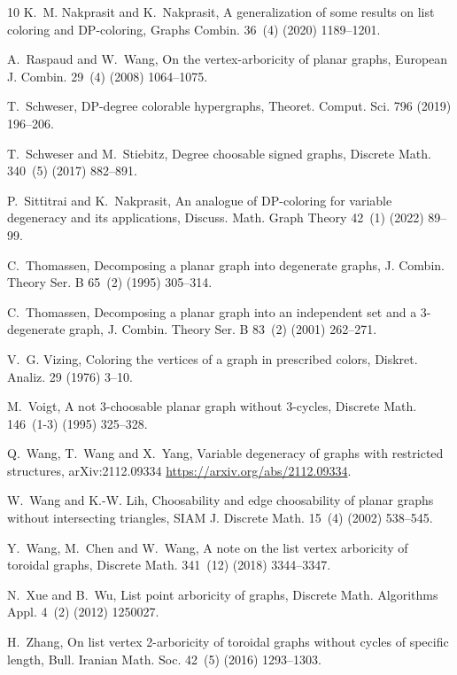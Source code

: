 \documentclass{article}
\theoremstyle{definition}
\begin{document}
\begin{thebibliography}{10}
K.~M. Nakprasit and K.~Nakprasit, A generalization of some results on list
  coloring and {DP}-coloring, Graphs Combin. 36~(4) (2020) 1189--1201.

A.~Raspaud and W.~Wang, On the vertex-arboricity of planar graphs, European J.
  Combin. 29~(4) (2008) 1064--1075.

T.~Schweser, D{P}-degree colorable hypergraphs, Theoret. Comput. Sci. 796
  (2019) 196--206.

T.~Schweser and M.~Stiebitz, Degree choosable signed graphs, Discrete Math.
  340~(5) (2017) 882--891.

P.~Sittitrai and K.~Nakprasit, An analogue of {DP}-coloring for variable
  degeneracy and its applications, Discuss. Math. Graph Theory 42~(1) (2022)
  89--99.

C.~Thomassen, Decomposing a planar graph into degenerate graphs, J. Combin.
  Theory Ser. B 65~(2) (1995) 305--314.

C.~Thomassen, Decomposing a planar graph into an independent set and a
  3-degenerate graph, J. Combin. Theory Ser. B 83~(2) (2001) 262--271.

V.~G. Vizing, Coloring the vertices of a graph in prescribed colors, Diskret.
  Analiz. 29 (1976) 3--10.

M.~Voigt, A not {$3$}-choosable planar graph without {$3$}-cycles, Discrete
  Math. 146~(1-3) (1995) 325--328.

Q.~Wang, T.~Wang and X.~Yang, Variable degeneracy of graphs with restricted
  structures, arXiv:2112.09334   \url{https://arxiv.org/abs/2112.09334}.

W.~Wang and K.-W. Lih, Choosability and edge choosability of planar graphs
  without intersecting triangles, SIAM J. Discrete Math. 15~(4) (2002)
  538--545.

Y.~Wang, M.~Chen and W.~Wang, A note on the list vertex arboricity of toroidal
  graphs, Discrete Math. 341~(12) (2018) 3344--3347.

N.~Xue and B.~Wu, List point arboricity of graphs, Discrete Math. Algorithms
  Appl. 4~(2) (2012) 1250027.

H.~Zhang, On list vertex 2-arboricity of toroidal graphs without cycles of
  specific length, Bull. Iranian Math. Soc. 42~(5) (2016) 1293--1303.

\end{thebibliography}
\end{document}
